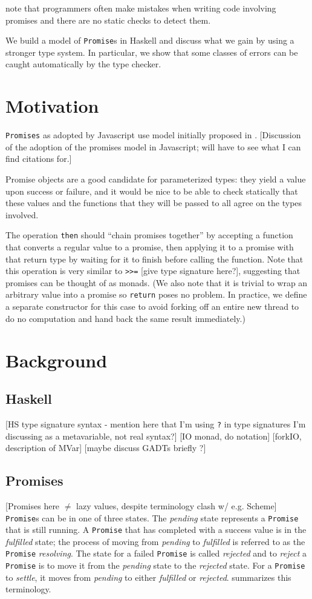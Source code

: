 \documentclass[12pt, english, letterpaper]{kuthesis}
\newcommand{\lit}[1]{\texttt{#1}}
\begin{document}
\cite{madsen} note that programmers often make mistakes when writing code involving promises and there are no static checks to detect them.

We build a model of \lit{Promise}s in Haskell and discuss what we gain by using a stronger type system.  In particular, we show that some classes of errors can be caught automatically by the type checker.
\chapter*{Motivation}
\lit{Promises} as adopted by Javascript use model initially proposed in \cite{friedman}.
[Discussion of the adoption of the promises model in Javascript; will have to see what I can find citations for.]

Promise objects are a good candidate for parameterized types: they yield a value upon success or failure, and it would be nice to be able to check statically that these values and the functions that they will be passed to all agree on the types involved.

The operation \lit{then} should ``chain promises together'' by accepting a function that converts a regular value to a promise, then applying it to a promise with that return type by waiting for it to finish before calling the function.  Note that this operation is very similar to \lit{>>=} [give type signature here?], suggesting that promises can be thought of as monads.  (We also note that it is trivial to wrap an arbitrary value into a promise so \lit{return} poses no problem.  In practice, we define a separate constructor for this case to avoid forking off an entire new thread to do no computation and hand back the same result immediately.)

\chapter*{Background}
\section*{Haskell}
[HS type signature syntax - mention here that I'm using \lit ? in type signatures I'm discussing as a metavariable, not real syntax?]
[IO monad, do notation]
[forkIO, description of MVar]
[maybe discuss GADTs briefly ?]

\section*{Promises}
[Promises here $\neq$ lazy values, despite terminology clash w/ e.g. Scheme]
\lit{Promise}s can be in one of three states.  The \emph{pending} state represents a \lit{Promise} that is still running.  A \lit{Promise} that has completed with a success value is in the \emph{fulfilled} state; the process of moving from \emph{pending} to \emph{fulfilled} is referred to as the \lit{Promise} \emph{resolving}.  The state for a failed \lit{Promise} is called \emph{rejected} and to \emph{reject} a \lit{Promise} is to move it from the \emph{pending} state to the \emph{rejected} state.  For a \lit{Promise} to \emph{settle}, it moves from \emph{pending} to either \emph{fulfilled} or \emph{rejected}.   summarizes this terminology.
\end{document}
